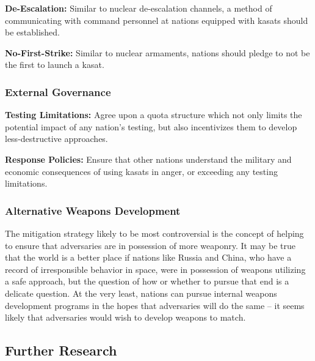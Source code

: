 \textbf{De-Escalation:} Similar to nuclear de-escalation channels, a
method of communicating with command personnel at nations equipped
with \acp{kasat} should be established.

\textbf{No-First-Strike:} Similar to nuclear armaments, nations should
pledge to not be the first to launch a \ac{kasat}.

\subsubsection{External Governance}

\textbf{Testing Limitations:} Agree upon a quota structure which not
only limits the potential impact of any nation's testing, but also
incentivizes them to develop less-destructive approaches.

\textbf{Response Policies:} Ensure that other nations understand the
military and economic consequences of using \acp{kasat} in anger, or
exceeding any testing limitations.

\subsubsection{Alternative Weapons Development}
The mitigation strategy likely to be most controversial is the concept
of helping to ensure that adversaries are in possession of more
weaponry.  It may be true that the world is a better place if nations
like Russia and China, who have a record of irresponsible behavior in
space, were in possession of weapons utilizing a \ac{safe} approach,
but the question of how or whether to pursue that end is a delicate
question.  At the very least, nations can pursue internal weapons
development programs in the hopes that adversaries will do the same --
it seems likely that adversaries would wish to develop weapons to
match.


\subsection{Further Research}
\label{section::furtherWork}

